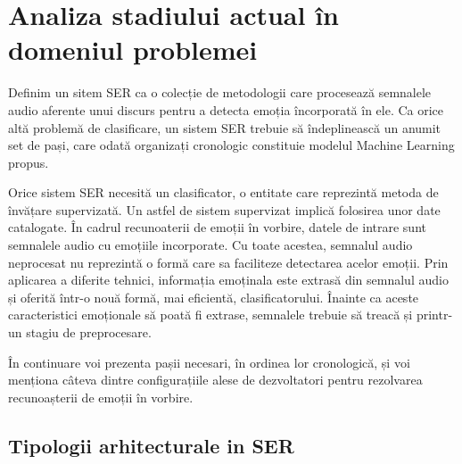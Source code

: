 \documentclass[a4paper,12pt]{book}
\begin{document}
	\chapter{Analiza stadiului actual în domeniul problemei} \label{introdP}
				Definim un sitem SER ca o colecție de metodologii care procesează semnalele audio aferente unui discurs pentru a detecta emoția încorporată în ele. Ca orice altă problemă de clasificare, un sistem SER trebuie să îndeplinească un anumit set de pași, care odată organizați cronologic constituie modelul Machine Learning propus. \par
				
				Orice sistem SER necesită un clasificator, o entitate care reprezintă metoda de învățare supervizată. Un astfel de sistem supervizat implică folosirea unor date catalogate. În cadrul recunoaterii de emoții în vorbire, datele de intrare sunt semnalele audio cu emoțiile incorporate. Cu toate acestea, semnalul audio neprocesat nu reprezintă o formă care sa faciliteze detectarea acelor emoții. Prin aplicarea a diferite tehnici, informația emoținala este extrasă din semnalul audio și oferită într-o nouă formă, mai eficientă,  clasificatorului. Înainte ca aceste caracteristici emoționale să poată fi extrase, semnalele trebuie să treacă și printr-un stagiu de preprocesare.\par
				
				În continuare voi prezenta pașii necesari, în ordinea lor cronologică, și voi menționa câteva dintre configurațiile alese de dezvoltatori pentru rezolvarea recunoașterii de emoții în vorbire.
				\section{Tipologii arhitecturale in SER} 
\end{document}
